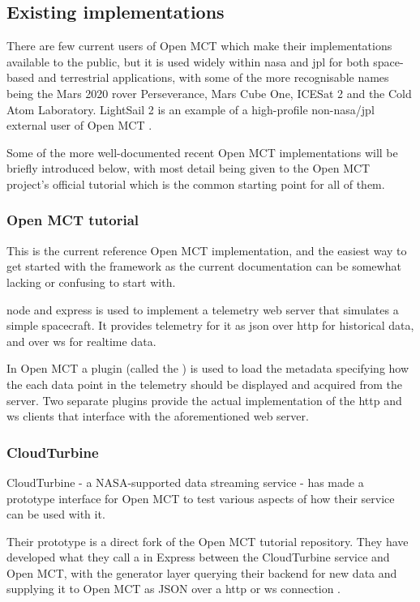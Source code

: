 \subsection{Existing implementations}
There are few current users of Open MCT which make their implementations available to the public, but it is used widely within \acrshort{nasa} and \acrshort{jpl} for both space-based and terrestrial applications, with some of the more recognisable names being the Mars 2020 rover Perseverance, Mars Cube One, ICESat 2 and the Cold Atom Laboratory. LightSail 2 is an example of a high-profile non-\acrshort{nasa}/\acrshort{jpl} external user of Open MCT \cite{omct_users}. 

Some of the more well-documented recent Open MCT implementations will be briefly introduced below, with most detail being given to the Open MCT project's official tutorial which is the common starting point for all of them.

\subsubsection{Open MCT tutorial}
This is the current reference Open MCT implementation, and the easiest way to get started with the framework as the current documentation can be somewhat lacking or confusing to start with.

\Gls{node} and \Gls{express} is used to implement a telemetry web server that simulates a simple spacecraft. It provides telemetry for it as \acrshort{json} over \acrshort{http} for historical data, and over \Gls{ws} for realtime data.

In Open MCT a plugin (called the ) is used to load the metadata specifying how the each data point in the telemetry should be displayed and acquired from the server. Two separate plugins provide the actual implementation of the \acrshort{http} and \Gls{ws} clients that interface with the aforementioned web server.


\subsubsection{CloudTurbine}
CloudTurbine - a NASA-supported data streaming service - has made a prototype interface for Open MCT to test various aspects of how their service can be used with it.

Their prototype is a direct fork of the Open MCT tutorial repository. They have developed what they call a  in Express between the CloudTurbine service and Open MCT, with the generator layer querying their backend for new data and supplying it to Open MCT as JSON over a \acrshort{http} or \Gls{ws} connection \cite{cloudturbine}. 

